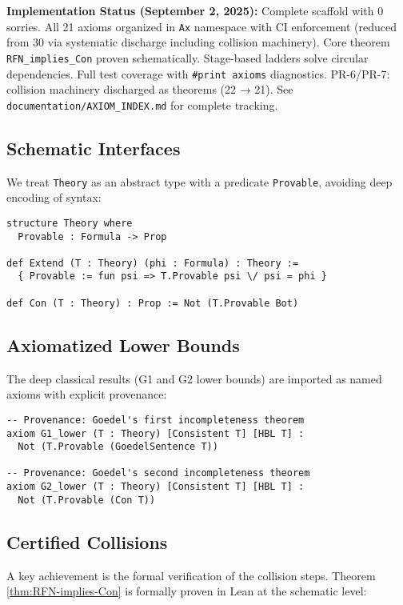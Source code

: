 \documentclass[11pt]{article}
\begin{document}
\begin{mdframed}[style=provenance]
\textbf{Implementation Status (September 2, 2025):} Complete scaffold with 0 sorries. All 21 axioms organized in \texttt{Ax} namespace with CI enforcement (reduced from 30 via systematic discharge including collision machinery). Core theorem \texttt{RFN\_implies\_Con} proven schematically. Stage-based ladders solve circular dependencies. Full test coverage with \texttt{\#print axioms} diagnostics. PR-6/PR-7: collision machinery discharged as theorems (22 → 21). See \texttt{documentation/AXIOM\_INDEX.md} for complete tracking.
\end{mdframed}

\subsection{Schematic Interfaces}
We treat \texttt{Theory} as an abstract type with a predicate \texttt{Provable}, avoiding deep encoding of syntax:

\begin{lstlisting}[language=Lean, caption={Core Theory Interface}]
structure Theory where
  Provable : Formula -> Prop

def Extend (T : Theory) (phi : Formula) : Theory :=
  { Provable := fun psi => T.Provable psi \/ psi = phi }

def Con (T : Theory) : Prop := Not (T.Provable Bot)
\end{lstlisting}

\subsection{Axiomatized Lower Bounds}
The deep classical results (G1 and G2 lower bounds) are imported as named axioms with explicit provenance:

\begin{lstlisting}[language=Lean, caption={Named Classical Axioms}]
-- Provenance: Goedel's first incompleteness theorem
axiom G1_lower (T : Theory) [Consistent T] [HBL T] :
  Not (T.Provable (GoedelSentence T))

-- Provenance: Goedel's second incompleteness theorem  
axiom G2_lower (T : Theory) [Consistent T] [HBL T] :
  Not (T.Provable (Con T))
\end{lstlisting}

\subsection{Certified Collisions}
A key achievement is the formal verification of the collision steps. Theorem \ref{thm:RFN-implies-Con} is formally proven in Lean at the schematic level:
\end{document}
